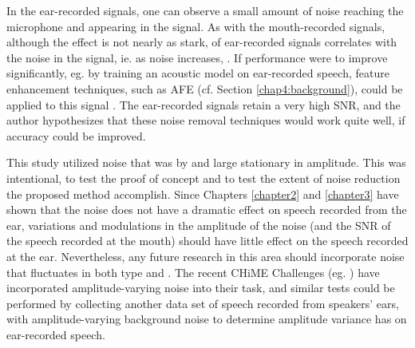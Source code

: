 \DIFaddend In the ear-recorded signals, one can observe a small amount of noise reaching the microphone and appearing in the signal.  As with the mouth-recorded signals, although the effect is not nearly as stark, \DIFdelbegin {}\DIFdelend \DIFaddbegin {}\DIFaddend of ear-recorded signals \DIFdelbegin {}\DIFdelend correlates with the noise in the signal, ie. as noise increases, \DIFdelbegin {}\DIFdelend \DIFaddbegin {}\DIFaddend .  If performance were to improve significantly, eg. by training an acoustic model on ear-recorded speech, feature enhancement techniques, such as AFE (cf. Section \ref{chap4:background}), could be applied to this signal \DIFaddbegin {}\DIFaddend .  The ear-recorded signals retain a very high SNR, and the author hypothesizes that these noise removal techniques would work quite well, if \DIFdelbegin {}\DIFdelend \DIFaddbegin {}\DIFaddend accuracy could be improved.


This study utilized noise that was by and large stationary in amplitude.  This was intentional, to test the proof of concept and to test the extent of noise reduction the proposed method \DIFdelbegin {}\DIFdelend \DIFaddbegin {}\DIFaddend accomplish.  Since Chapters \ref{chapter2} and \ref{chapter3} have shown that the noise does not have a dramatic effect on speech recorded from the ear, variations and modulations in the amplitude of the noise (and the SNR of the speech recorded at the mouth) should have little effect on the speech recorded at the ear.  Nevertheless, any future research in this area should incorporate noise that fluctuates in both type and \DIFdelbegin {}\DIFdelend \DIFaddbegin {}\DIFaddend .  The recent CHiME Challenges (eg. \cite{chime:16}) have incorporated amplitude-varying noise into their task, and similar tests could be performed by collecting another data set of speech recorded from speakers' ears, with amplitude-varying background noise to determine \DIFdelbegin {}\DIFdelend \DIFaddbegin {}\DIFaddend amplitude variance has \DIFdelbegin {}\DIFdelend on ear-recorded speech.


